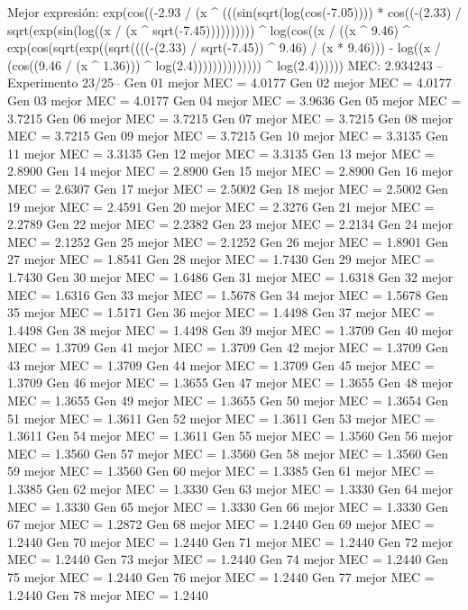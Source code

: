 Mejor expresión: exp(cos((-2.93 / (x ^ (((sin(sqrt(log(cos(-7.05)))) * cos((-(2.33) / sqrt(exp(sin(log((x / (x ^ sqrt(-7.45)))))))))) ^ log(cos((x / ((x ^ 9.46) ^ exp(cos(sqrt(exp((sqrt((((-(2.33) / sqrt(-7.45)) ^ 9.46) / (x * 9.46))) - log((x / (cos((9.46 / (x ^ 1.36))) ^ log(2.4)))))))))))))) ^ log(2.4))))))
MEC: 2.934243
--Experimento 
 23/25--
Gen 01 mejor MEC = 4.0177
Gen 02 mejor MEC = 4.0177
Gen 03 mejor MEC = 4.0177
Gen 04 mejor MEC = 3.9636
Gen 05 mejor MEC = 3.7215
Gen 06 mejor MEC = 3.7215
Gen 07 mejor MEC = 3.7215
Gen 08 mejor MEC = 3.7215
Gen 09 mejor MEC = 3.7215
Gen 10 mejor MEC = 3.3135
Gen 11 mejor MEC = 3.3135
Gen 12 mejor MEC = 3.3135
Gen 13 mejor MEC = 2.8900
Gen 14 mejor MEC = 2.8900
Gen 15 mejor MEC = 2.8900
Gen 16 mejor MEC = 2.6307
Gen 17 mejor MEC = 2.5002
Gen 18 mejor MEC = 2.5002
Gen 19 mejor MEC = 2.4591
Gen 20 mejor MEC = 2.3276
Gen 21 mejor MEC = 2.2789
Gen 22 mejor MEC = 2.2382
Gen 23 mejor MEC = 2.2134
Gen 24 mejor MEC = 2.1252
Gen 25 mejor MEC = 2.1252
Gen 26 mejor MEC = 1.8901
Gen 27 mejor MEC = 1.8541
Gen 28 mejor MEC = 1.7430
Gen 29 mejor MEC = 1.7430
Gen 30 mejor MEC = 1.6486
Gen 31 mejor MEC = 1.6318
Gen 32 mejor MEC = 1.6316
Gen 33 mejor MEC = 1.5678
Gen 34 mejor MEC = 1.5678
Gen 35 mejor MEC = 1.5171
Gen 36 mejor MEC = 1.4498
Gen 37 mejor MEC = 1.4498
Gen 38 mejor MEC = 1.4498
Gen 39 mejor MEC = 1.3709
Gen 40 mejor MEC = 1.3709
Gen 41 mejor MEC = 1.3709
Gen 42 mejor MEC = 1.3709
Gen 43 mejor MEC = 1.3709
Gen 44 mejor MEC = 1.3709
Gen 45 mejor MEC = 1.3709
Gen 46 mejor MEC = 1.3655
Gen 47 mejor MEC = 1.3655
Gen 48 mejor MEC = 1.3655
Gen 49 mejor MEC = 1.3655
Gen 50 mejor MEC = 1.3654
Gen 51 mejor MEC = 1.3611
Gen 52 mejor MEC = 1.3611
Gen 53 mejor MEC = 1.3611
Gen 54 mejor MEC = 1.3611
Gen 55 mejor MEC = 1.3560
Gen 56 mejor MEC = 1.3560
Gen 57 mejor MEC = 1.3560
Gen 58 mejor MEC = 1.3560
Gen 59 mejor MEC = 1.3560
Gen 60 mejor MEC = 1.3385
Gen 61 mejor MEC = 1.3385
Gen 62 mejor MEC = 1.3330
Gen 63 mejor MEC = 1.3330
Gen 64 mejor MEC = 1.3330
Gen 65 mejor MEC = 1.3330
Gen 66 mejor MEC = 1.3330
Gen 67 mejor MEC = 1.2872
Gen 68 mejor MEC = 1.2440
Gen 69 mejor MEC = 1.2440
Gen 70 mejor MEC = 1.2440
Gen 71 mejor MEC = 1.2440
Gen 72 mejor MEC = 1.2440
Gen 73 mejor MEC = 1.2440
Gen 74 mejor MEC = 1.2440
Gen 75 mejor MEC = 1.2440
Gen 76 mejor MEC = 1.2440
Gen 77 mejor MEC = 1.2440
Gen 78 mejor MEC = 1.2440

